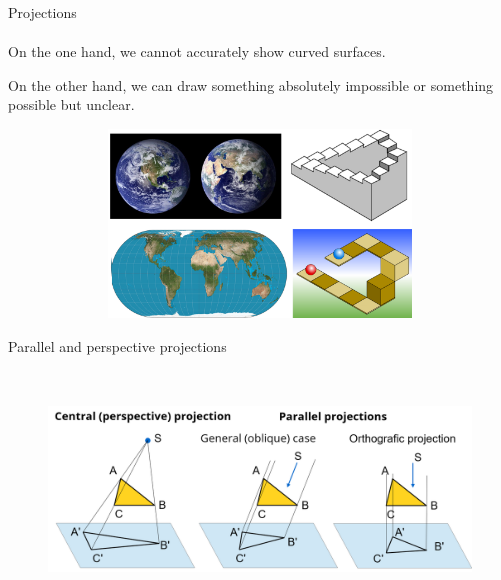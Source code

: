\documentclass[aspectratio=169]{beamer}
\begin{document}
\begin{frame}[t]{Projections}
    \framesubtitle{}
    \vspace{-0.3cm}
    On the one hand, we cannot accurately show curved surfaces.

    On the other hand, we can draw something absolutely impossible or something possible but unclear.

    \vspace{-0.5cm}

    \begin{figure}[H]
        \centering\includegraphics[height=5cm,width=1\textwidth,keepaspectratio]{resources/proj_1.png}
        \label{fig:resources/proj_1.png}
    \end{figure}
\end{frame}

\begin{frame}[t]{Parallel and perspective projections}
    \framesubtitle{}
    \vspace{-0.6cm}
    \begin{figure}[H]
        \centering\includegraphics[height=6cm,width=1\textwidth,keepaspectratio]{resources/proj_2.png}
        \label{fig:resources/proj_2.png}
    \end{figure}
\end{frame}
\end{document}
